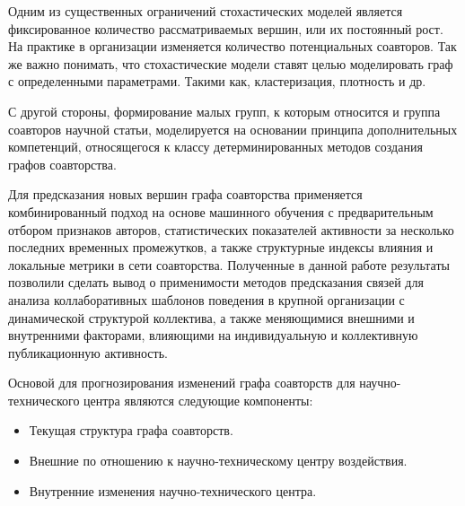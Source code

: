 Одним из существенных ограничений стохастических моделей является фиксированное количество рассматриваемых вершин, или их постоянный рост. 
На практике в организации изменяется количество потенциальных соавторов.
Так же важно понимать, что стохастические модели ставят целью моделировать граф с определенными параметрами. 
Такими как, кластеризация, плотность и др.

С другой стороны, формирование малых групп, к которым относится и группа соавторов научной статьи, моделируется на основании принципа дополнительных компетенций, относящегося к классу детерминированных методов создания графов соавторства. 

Для предсказания новых вершин графа соавторства применяется комбинированный подход на основе машинного обучения с предварительным отбором признаков авторов, статистических показателей активности за несколько последних временных промежутков, а также структурные индексы влияния и локальные метрики в сети соавторства. 
Полученные в данной работе результаты позволили сделать вывод о применимости методов предсказания связей для анализа коллаборативных шаблонов поведения в крупной организации с динамической структурой коллектива, а также меняющимися внешними и внутренними факторами, влияющими на индивидуальную и коллективную публикационную активность.

Основой для прогнозирования изменений графа соавторств для научно-технического центра являются следующие компоненты: 
\begin{itemize}
\item Текущая структура графа соавторств.
\item Внешние по отношению к научно-техническому центру воздействия.
\item Внутренние изменения научно-технического центра. 
\end{itemize}

